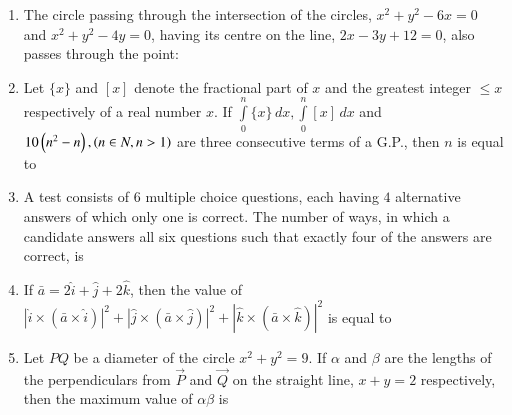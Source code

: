 \documentclass[journal]{IEEEtran}
\begin{document}
\begin{enumerate}[start=16]
\begin{enumerate}
\end{enumerate}

\item The circle passing through the intersection of the circles, $x^2+y^2-6x=0$ and $x^2+y^2-4y=0$, having its centre on the line, $2x-3y+12=0$, also passes through the point:
\begin{enumerate}
\end{enumerate}

\item Let $\{x\}$ and ${[x]}$ denote the fractional part of $x$ and the greatest integer $\leq x$ respectively of a real number $x$. If $\int\limits_0^n\{x\} \, dx,\int\limits_0^n{[x]} \, dx$ and $10\left(n^2-n\right),\left(n \in N,n>1\right)$ are three consecutive terms of a G.P., then $n$ is equal to \underline{\hspace{1cm}}\\ 

\item A test consists of $6$ multiple choice questions, each having $4$ alternative answers of which only one is correct. The number of ways, in which a candidate answers all six questions such that exactly four of the answers are correct, is \underline{\hspace{1cm}}\\

\item If $\bar{a} = 2\hat{i} + \hat{j} + 2\hat{k}$, then the value of $|\hat{i} \times (\bar{a} \times \hat{i})|^2 + |\hat{j} \times (\bar{a} \times \hat{j})|^2 + |\hat{k} \times (\bar{a} \times \hat{k})|^2$  is equal to \underline{\hspace{1cm}}\\

\item Let $PQ$ be a diameter of the circle $x^2+y^2=9$. If $\alpha$ and $\beta$ are the lengths of the perpendiculars from $\vec{P}$ and $\vec{Q}$ on the straight line, $x+y=2$ respectively, then the maximum value of $\alpha\beta$ is \underline{\hspace{1cm}}\\


\end{enumerate}
\end{document}
